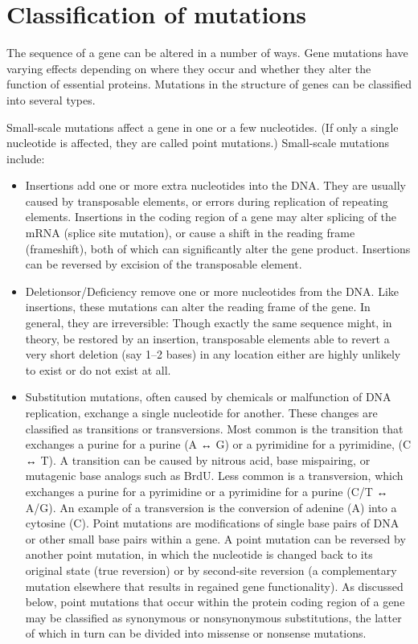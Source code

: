 \hypertarget{classification-of-mutations}{%
\section{Classification of mutations}\label{classification-of-mutations}}

The sequence of a gene can be altered in a number of ways. Gene mutations have varying effects depending on where they occur and whether they alter the function of essential proteins. Mutations in the structure of genes can be classified into several types.

Small-scale mutations affect a gene in one or a few nucleotides. (If only a single nucleotide is affected, they are called point mutations.) Small-scale mutations include:

\begin{itemize}
\tightlist
\item
  Insertions add one or more extra nucleotides into the DNA. They are usually caused by transposable elements, or errors during replication of repeating elements. Insertions in the coding region of a gene may alter splicing of the mRNA (splice site mutation), or cause a shift in the reading frame (frameshift), both of which can significantly alter the gene product. Insertions can be reversed by excision of the transposable element.
\item
  Deletionsor/Deficiency remove one or more nucleotides from the DNA. Like insertions, these mutations can alter the reading frame of the gene. In general, they are irreversible: Though exactly the same sequence might, in theory, be restored by an insertion, transposable elements able to revert a very short deletion (say 1--2 bases) in any location either are highly unlikely to exist or do not exist at all.
\item
  Substitution mutations, often caused by chemicals or malfunction of DNA replication, exchange a single nucleotide for another. These changes are classified as transitions or transversions. Most common is the transition that exchanges a purine for a purine (A ↔ G) or a pyrimidine for a pyrimidine, (C ↔ T). A transition can be caused by nitrous acid, base mispairing, or mutagenic base analogs such as BrdU. Less common is a transversion, which exchanges a purine for a pyrimidine or a pyrimidine for a purine (C/T ↔ A/G). An example of a transversion is the conversion of adenine (A) into a cytosine (C). Point mutations are modifications of single base pairs of DNA or other small base pairs within a gene. A point mutation can be reversed by another point mutation, in which the nucleotide is changed back to its original state (true reversion) or by second-site reversion (a complementary mutation elsewhere that results in regained gene functionality). As discussed below, point mutations that occur within the protein coding region of a gene may be classified as synonymous or nonsynonymous substitutions, the latter of which in turn can be divided into missense or nonsense mutations.
\end{itemize}

